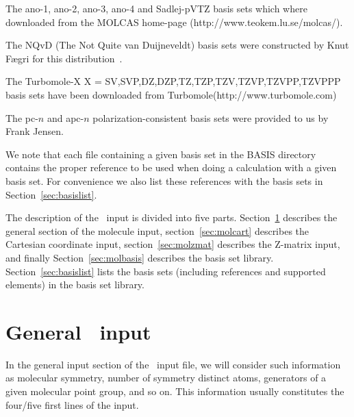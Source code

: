 \begin{list}{--}{}
\item The ano-1, ano-2, ano-3, ano-4 and Sadlej-pVTZ basis sets which where
downloaded from the MOLCAS home-page
(http://www.teokem.lu.se/molcas/).
\item The NQvD (The Not Quite van Duijneveldt) basis sets were constructed
by Knut F\ae gri for this distribution~\cite{nqvdref}.
\item The Turbomole-X {X = SV,SVP,DZ,DZP,TZ,TZP,TZV,TZVP,TZVPP,TZVPPP} basis sets have
been downloaded from Turbomole(http://www.turbomole.com)
\item The pc-$n$ and apc-$n$ polarization-consistent basis sets were provided to us by Frank Jensen.
\end{list}

We note that each file containing a given basis set in the BASIS
directory contains the proper reference to be used when doing a 
calculation with a given basis set. For convenience we also list 
these references with the basis sets in Section~\ref{sec:basislist}.

The description of the \mol\ input is divided into five parts.
Section~\ref{sec:molgeneral} describes the general section of the
molecule input,
section~\ref{sec:molcart} describes the Cartesian coordinate
input,
section~\ref{sec:molzmat} describes the Z-matrix
input, and finally
Section~\ref{sec:molbasis} describes the basis set
library.
Section~\ref{sec:basislist} lists the basis sets (including references and supported elements) 
in the basis set library.

\section{General \mol\ input}\label{sec:molgeneral}

In the general input section of the \mol\ input file, we will consider
such information as molecular symmetry, number of
symmetry distinct atoms, generators of a
given molecular point group, and so on.
This information usually constitutes the four/five first lines of the
input.

